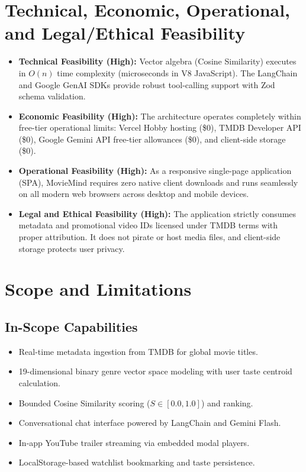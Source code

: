 \documentclass[11pt,a4paper]{article}
\begin{document}
\section{Technical, Economic, Operational, and Legal/Ethical Feasibility}

\begin{itemize}[leftmargin=*]
    \item \textbf{Technical Feasibility (High):} Vector algebra (Cosine Similarity) executes in $O(n)$ time complexity (microseconds in V8 JavaScript). The LangChain and Google GenAI SDKs provide robust tool-calling support with Zod schema validation.
    \item \textbf{Economic Feasibility (High):} The architecture operates completely within free-tier operational limits: Vercel Hobby hosting (\$0), TMDB Developer API (\$0), Google Gemini API free-tier allowances (\$0), and client-side storage (\$0).
    \item \textbf{Operational Feasibility (High):} As a responsive single-page application (SPA), MovieMind requires zero native client downloads and runs seamlessly on all modern web browsers across desktop and mobile devices.
    \item \textbf{Legal and Ethical Feasibility (High):} The application strictly consumes metadata and promotional video IDs licensed under TMDB terms with proper attribution. It does not pirate or host media files, and client-side storage protects user privacy.
\end{itemize}

\section{Scope and Limitations}

\subsection{In-Scope Capabilities}
\begin{itemize}[leftmargin=*]
    \item Real-time metadata ingestion from TMDB for global movie titles.
    \item 19-dimensional binary genre vector space modeling with user taste centroid calculation.
    \item Bounded Cosine Similarity scoring ($S \in [0.0, 1.0]$) and ranking.
    \item Conversational chat interface powered by LangChain and Gemini Flash.
    \item In-app YouTube trailer streaming via embedded modal players.
    \item LocalStorage-based watchlist bookmarking and taste persistence.
\end{itemize}
\end{document}
